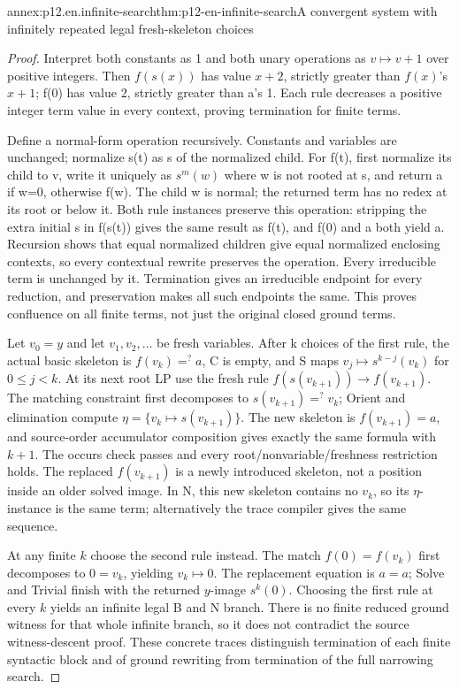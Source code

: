 \begin{annexitem}{annex:p12.en.infinite-search}{thm:p12-en-infinite-search}{A convergent system with infinitely repeated legal fresh-skeleton choices}
\begin{proof}
Interpret both constants as 1 and both unary operations as
\(v\mapsto v+1\) over positive integers. Then
\(f(s(x))\) has value \(x+2\), strictly greater than
\(f(x)\)'s \(x+1\); f(0) has value 2, strictly greater
than a's 1. Each rule decreases a positive integer term value
in every context, proving termination for finite terms.

Define a normal-form operation recursively. Constants and variables
are unchanged; normalize s(t) as s of the normalized child.
For f(t), first normalize its child to v, write it uniquely as
\(s^m(w)\) where w is not rooted at s, and return a if w=0,
otherwise f(w). The child w is normal; the returned term has no
redex at its root or below it. Both rule instances preserve this
operation: stripping the extra initial s in f(s(t)) gives the
same result as f(t), and f(0) and a both yield a. Recursion
shows that equal normalized children give equal normalized enclosing
contexts, so every contextual rewrite preserves the operation.
Every irreducible term is unchanged by it. Termination gives an
irreducible endpoint for every reduction, and preservation makes
all such endpoints the same. This proves confluence on all
finite terms, not just the original closed ground terms.

Let \(v_0=y\) and let \(v_1,v_2,\ldots\) be fresh variables.
After k choices of the first rule, the actual basic skeleton is
\(f(v_k)=^{?}a\), C is empty, and S maps
\(v_j\mapsto s^{k-j}(v_k)\) for \(0\leq j<k\).
At its next root LP use the fresh rule
\(f(s(v_{k+1}))\to f(v_{k+1})\).
The matching constraint first decomposes to
\(s(v_{k+1})=^{?}v_k\); Orient and elimination compute
\(\eta=\{v_k\mapsto s(v_{k+1})\}\).
The new skeleton is \(f(v_{k+1})=a\), and source-order accumulator
composition gives exactly the same formula with \(k+1\). The occurs
check passes and every root/nonvariable/freshness restriction holds.
The replaced \(f(v_{k+1})\) is a newly introduced skeleton, not a
position inside an older solved image. In N, this new skeleton
contains no \(v_k\), so its \(\eta\)-instance is the same
term; alternatively the trace compiler gives the same sequence.

At any finite \(k\) choose the second rule instead. The match
\(f(0)=f(v_k)\) first decomposes to \(0=v_k\), yielding
\(v_k\mapsto0\). The replacement equation is \(a=a\); Solve
and Trivial finish with the returned \(y\)-image \(s^k(0)\).
Choosing the first rule at every \(k\) yields an infinite legal B
and N branch. There is no finite reduced ground witness for
that whole infinite branch, so it does not contradict the
source witness-descent proof. These concrete traces distinguish
termination of each finite syntactic block and of ground rewriting
from termination of the full narrowing search.


\end{proof}
\end{annexitem}
